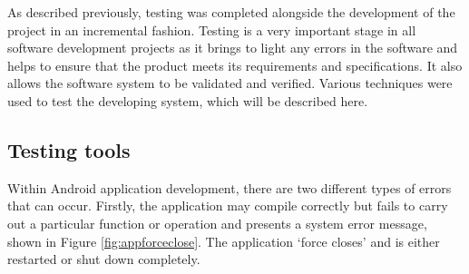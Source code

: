 \documentclass[a4paper,12pt]{report}
\begin{document}
As described previously, testing was completed alongside the development of the project in an incremental fashion. Testing is a very important stage in all software development projects as it brings to light any errors in the software and helps to ensure that the product meets its requirements and specifications. It also allows the software system to be validated and verified. Various techniques were used to test the developing system, which will be described here. 

\subsection{Testing tools}

Within Android application development, there are two different types of errors that can occur. Firstly, the application may compile correctly but fails to carry out a particular function or operation and presents a system error message, shown in Figure \ref{fig:appforceclose}. The application ‘force closes’ and is either restarted or shut down completely. 
\end{document}

